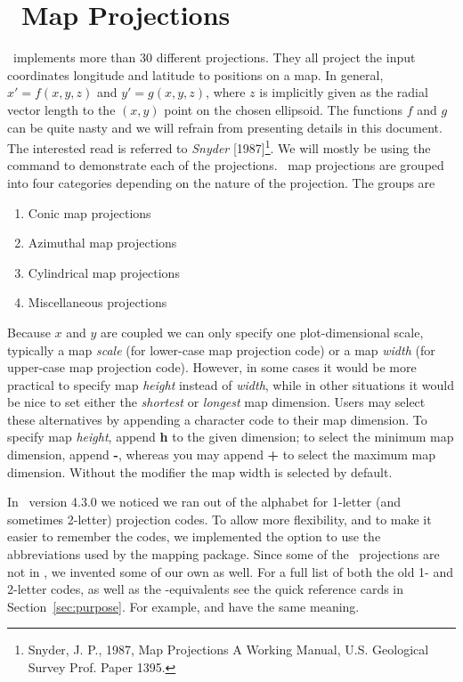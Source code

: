 %
%
\chapter{\gmt\ Map Projections}
\label{ch:6}

\GMT\ implements more than 30 different projections.  They all project the input coordinates
longitude and latitude to positions on a map.  In general, $x' = f(x,y,z)$ and $y' = g(x,y,z)$, where
$z$ is implicitly given as the radial vector length to the $(x,y)$ point on the chosen ellipsoid.  The functions $f$ and $g$ can be
quite nasty and we will refrain from presenting details in this document.  The interested read is referred to
{\it Snyder} [1987]\footnote{Snyder, J. P., 1987, Map Projections \- A Working Manual, U.S. Geological Survey Prof. Paper 1395.}.
We will mostly be using the  command to demonstrate each of the projections.
\GMT\ map projections are grouped into four categories depending on the
nature of the projection.  The groups are

\begin{enumerate}
\item Conic map projections
\item Azimuthal map projections
\item Cylindrical map projections
\item Miscellaneous projections
\end{enumerate}

Because $x$ and $y$ are coupled we can only specify one plot-dimensional scale, typically
a map \emph{scale} (for lower-case map projection code) or a map \emph{width} (for upper-case
map projection code).  However, in some cases it would be more
practical to specify map \emph{height} instead of \emph{width}, while in other situations it would be nice
to set either the \emph{shortest} or \emph{longest} map dimension.  Users may select
these alternatives by appending a character code to their map dimension.  To specify map \emph{height},
append \textbf{h} to the given dimension; to select the minimum map dimension, append \textbf{-}, whereas you may
append \textbf{+} to select the maximum map dimension.  Without the modifier the map width is
selected by default.

In \GMT\ version 4.3.0 we noticed we ran out of the alphabet for 1-letter (and sometimes 2-letter) projection codes. To allow more flexibility, and to make it easier to remember the codes, we implemented the option to use the abbreviations used by the  mapping package. Since some of the \GMT\ projections are not in , we invented some of our own as well. For a full list of both the old 1- and 2-letter codes, as well as the -equivalents see the quick reference cards in Section~\ref{sec:purpose}. For example,  and  have the same meaning.





